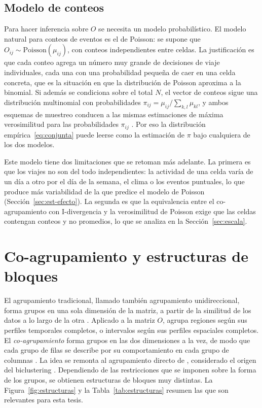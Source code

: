 \subsection{Modelo de conteos}\label{sec:modelo-conteos}

Para hacer inferencia sobre $O$ se necesita un modelo probabilístico. El modelo
natural para conteos de eventos es el de Poisson: se supone que
$O_{ij} \sim \mathrm{Poisson}(\mu_{ij})$, con conteos independientes entre celdas.
La justificación es que cada conteo agrega un número muy grande de decisiones de
viaje individuales, cada una con una probabilidad pequeña de caer en una celda
concreta, que es la situación en que la distribución de Poisson aproxima a la
binomial. Si además se condiciona sobre el total $N$, el vector de conteos sigue
una distribución multinomial con probabilidades $\pi_{ij} = \mu_{ij}/\sum_{k,l}
\mu_{kl}$, y ambos esquemas de muestreo conducen a las mismas estimaciones de
máxima verosimilitud para las probabilidades $\pi_{ij}$ \cite{Agresti2013}. Por eso
la distribución empírica~\eqref{eq:conjunta} puede leerse como la estimación de
$\pi$ bajo cualquiera de los dos modelos.

Este modelo tiene dos limitaciones que se retoman más adelante. La primera es que
los viajes no son del todo independientes: la actividad de una celda varía de un
día a otro por el día de la semana, el clima o los eventos puntuales, lo que
produce más variabilidad de la que predice el modelo de Poisson
(Sección~\ref{sec:est-efecto}). La segunda es que la equivalencia entre el
co-agrupamiento con I-divergencia y la verosimilitud de Poisson exige que las
celdas contengan conteos y no promedios, lo que se analiza en la
Sección~\ref{sec:escala}.

\section{Co-agrupamiento y estructuras de bloques}\label{sec:estructuras}

El agrupamiento tradicional, llamado también agrupamiento unidireccional, forma
grupos en una sola dimensión de la matriz, a partir de la similitud de los datos a
lo largo de la otra \cite{Wu2020}. Aplicado a la matriz $O$, agrupa regiones según
sus perfiles temporales completos, o intervalos según sus perfiles espaciales
completos. El \emph{co-agrupamiento} forma grupos en las dos dimensiones a la vez,
de modo que cada grupo de filas se describe por su comportamiento en cada grupo de
columnas \cite{Wu2020}. La idea se remonta al agrupamiento directo de
\cite{Hartigan1972}, considerado el origen del biclustering \cite{Castanho2024}.
Dependiendo de las restricciones que se imponen sobre la forma de los grupos, se
obtienen estructuras de bloques muy distintas. La
Figura~\ref{fig:estructuras} y la Tabla~\ref{tab:estructuras} resumen las que son
relevantes para esta tesis.

